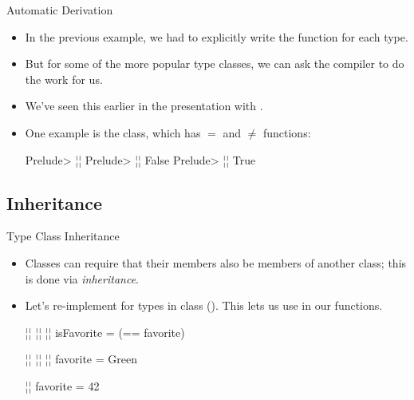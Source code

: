 \documentclass[xcolor=dvipsnames]{beamer}          %
\newcommand{\lH}[1]{\color{MidnightBlue}{#1}}
\newcommand{\lT}[1]{\color{Fuchsia}{#1}}        %
\begin{document}
\begin{frame}[fragile]{Automatic Derivation}
\begin{itemize}
    \item In the previous example, we had to explicitly write the
         function for each type.
    \item But for some of the more popular type classes, we can ask the
        compiler to do the work for us.
    \item We've seen this earlier in the presentation with .
    \item One example is the  class, which has $=$ and $\ne$ functions:
        \begin{olisting}
            Prelude> ¦\lT{data Color = Red | Green | Blue   deriving (Eq)}¦
            Prelude> ¦\lH{Red == Blue}¦
            False
            Prelude> ¦\lH{Green /= Blue}¦
            True
        \end{olisting}
\end{itemize}
\end{frame}


\subsection{Inheritance}

\begin{frame}[fragile]{Type Class Inheritance}
\begin{itemize}
    \item Classes can require that their members also be members of
        another class; this is done via \emph{inheritance}.
    \item Let's re-implement  for types in class 
        (). This
        lets us use \T{==} in our functions.
        \begin{hlisting}
            ¦\lT{class Eq a => Favorite a where}¦
                ¦\lT{favorite :: a}¦
                ¦\lT{isFavorite :: a -> Bool}¦
                isFavorite = (== favorite)

            ¦\lT{data Color = Red | Green | Blue}¦
                ¦\lT{deriving Eq}¦
            ¦\lT{instance Favorite Color where}¦
                favorite = Green

            ¦\lT{instance Favorite Int where}¦
                favorite = 42
        \end{hlisting}
\end{itemize}
\end{frame}
\end{document}
